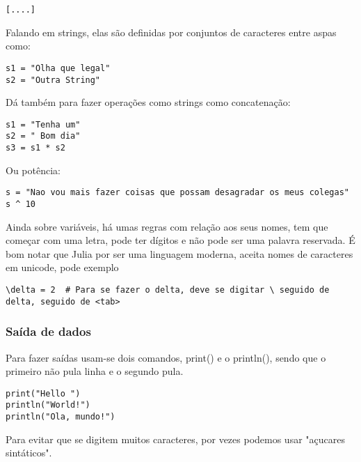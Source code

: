 \documentclass[a4paper]{article}
\begin{document}
\begin{verbatim}
[....]
\end{verbatim}


Falando em strings, elas são definidas por conjuntos de caracteres entre aspas como:
\lstset{language=ein-julia,label=orgdefba4d,caption= ,captionpos=b,numbers=none}
\begin{lstlisting}
s1 = "Olha que legal"
s2 = "Outra String"
\end{lstlisting}

Dá também para fazer operações como strings como concatenação:

\lstset{language=ein-julia,label=org5871f5c,caption= ,captionpos=b,numbers=none}
\begin{lstlisting}
s1 = "Tenha um"
s2 = " Bom dia"
s3 = s1 * s2
\end{lstlisting}

Ou potência:

\lstset{language=ein-julia,label=orga488a79,caption= ,captionpos=b,numbers=none}
\begin{lstlisting}
s = "Nao vou mais fazer coisas que possam desagradar os meus colegas"
s ^ 10
\end{lstlisting}

Ainda sobre variáveis, há umas regras com relação aos seus nomes, tem que
começar com uma letra, pode ter dígitos e não pode ser uma palavra reservada.  É
bom notar que Julia por ser uma linguagem moderna, aceita nomes de caracteres em
unicode, pode exemplo

\lstset{language=ein-julia,label= ,caption= ,captionpos=b,numbers=none}
\begin{lstlisting}
\delta = 2  # Para se fazer o delta, deve se digitar \ seguido de delta, seguido de <tab>
\end{lstlisting}
\subsubsection{Saída de dados}
\label{sec:org3b9f9f1}
Para fazer saídas usam-se dois comandos, print() e o println(), sendo que o primeiro não pula linha e o segundo pula.
\lstset{language=ein-julia,label=orgbe66d56,caption= ,captionpos=b,numbers=none}
\begin{lstlisting}
print("Hello ")
println("World!")
println("Ola, mundo!")
\end{lstlisting}

Para evitar que se digitem muitos caracteres, por vezes podemos usar "açucares sintáticos".
\end{document}
